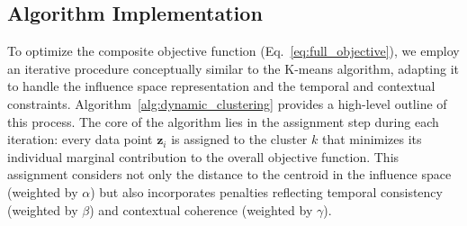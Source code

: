 \documentclass[final,authoryear,3p,times,review,sort&compress]{elsarticle}
\newcommand{\vect}[1]{\mathbf{#1}}
\begin{document}
\subsection{Algorithm Implementation}
\label{sec:algorithm_method}
To optimize the composite objective function (Eq.~\ref{eq:full_objective}), we employ an iterative procedure conceptually similar to the K-means algorithm, adapting it to handle the influence space representation and the temporal and contextual constraints. Algorithm~\ref{alg:dynamic_clustering} provides a high-level outline of this process. The core of the algorithm lies in the assignment step during each iteration: every data point $\vect{z}_i$ is assigned to the cluster $k$ that minimizes its individual marginal contribution to the overall objective function. This assignment considers not only the distance to the centroid in the influence space (weighted by $\alpha$) but also incorporates penalties reflecting temporal consistency (weighted by $\beta$) and contextual coherence (weighted by $\gamma$).
\end{document}
